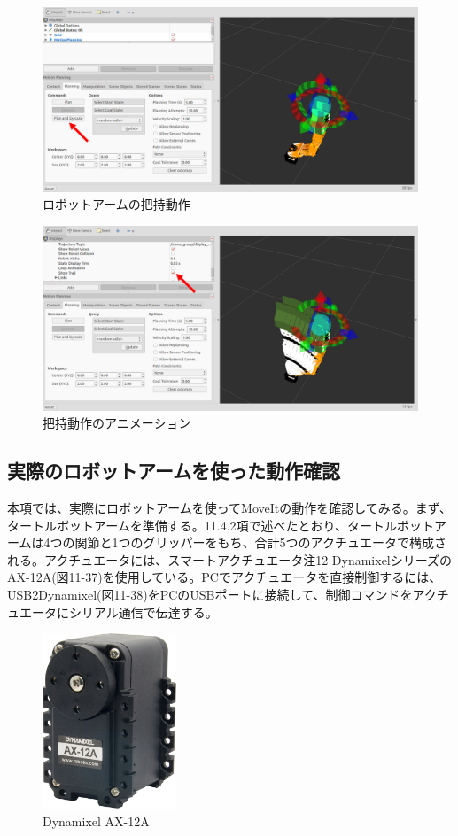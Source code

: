 \begin{figure}[htp]
  \centering
  \includegraphics[width=12cm]{pictures/chapter11/pic_11_35.png}
  \caption{ロボットアームの把持動作}
\end{figure}

\begin{figure}[htp]
  \centering
  \includegraphics[width=12cm]{pictures/chapter11/pic_11_36.png}
  \caption{把持動作のアニメーション}
\end{figure}

\subsection{実際のロボットアームを使った動作確認}

本項では、実際にロボットアームを使ってMoveItの動作を確認してみる。まず、タートルボットアームを準備する。11.4.2項で述べたとおり、タートルボットアームは4つの関節と1つのグリッパーをもち、合計5つのアクチュエータで構成される。アクチュエータには、スマートアクチュエータ注12 DynamixelシリーズのAX-12A(図11-37)を使用している。PCでアクチュエータを直接制御するには、USB2Dynamixel(図11-38)をPCのUSBポートに接続して、制御コマンドをアクチュエータにシリアル通信で伝達する。

\begin{figure}[htp]
  \centering
  \includegraphics[width=4cm]{pictures/chapter11/pic_11_37.png}
  \caption{Dynamixel AX-12A}
\end{figure}

